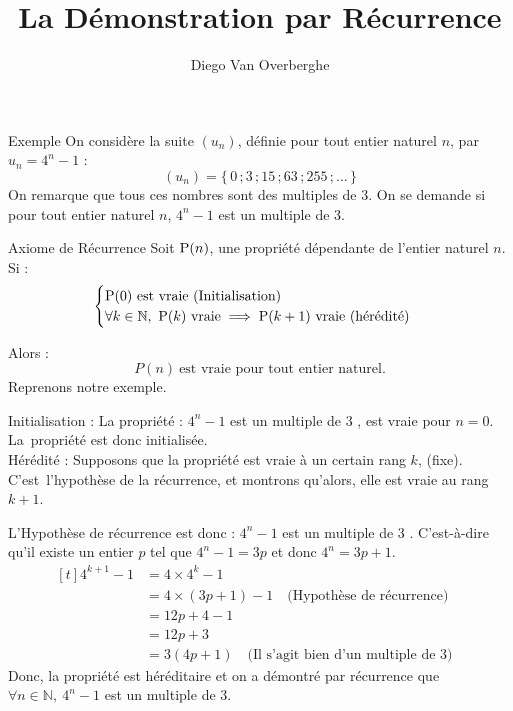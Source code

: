\documentclass{cours}
\title{La Démonstration par Récurrence}
\author{Diego Van Overberghe}
\begin{document}

    \begin{Gpartie}{Exemple}
        On considère la suite $\left(u_n\right)$, définie pour tout entier naturel $n$, par $u_n=4^n-1$ :
        \[\left(u_n\right)=\big\{\,0\,; 3\,; 15\,; 63\,; 255\,; \dotso\,\big\}\]
        On remarque que tous ces nombres sont des multiples de 3. On se demande si pour tout entier naturel $n$, $4^n-1$ est un multiple de 3.
    \end{Gpartie}
    \begin{Gpartie}{Axiome de Récurrence}
        Soit $\mathrm{P}(n)$, une propriété dépendante de l'entier naturel $n$.\\
        Si :
        \[\begin{cases}
            \mathrm{P}(0)\text{ est vraie (Initialisation)} \\ \forall k\in\mathbb{N},~\mathrm{P}(k)\text{ vraie}\implies\mathrm{P}(k+1)\text{ vraie (hérédité)}
        \end{cases}\]

        Alors : \[P(n)~\text{est vraie pour tout entier naturel.}\]
        Reprenons notre exemple. 
        
        Initialisation : La propriété : \og $4^n-1$ est un multiple de 3 \fg{}, est vraie pour $n=0$. La~propriété est donc initialisée. \\ 
        Hérédité : Supposons que la propriété est vraie à un certain rang $k$, (fixe). C'est~l'hypothèse de la récurrence, et montrons qu'alors, elle est vraie au rang $k+1$.
        
        L'Hypothèse de récurrence est donc : \og $4^n-1$ est un multiple de 3 \fg{}. C'est-à-dire qu'il existe un entier $p$ tel que $4^n-1=3p$ et donc $4^n=3p+1$.
        \vspace*{-1ex}\[\begin{aligned}[t]
            4^{k+1}-1&=4\times 4^k-1 &\\
            &= 4\times\left(3p+1\right)-1 \quad \text{(Hypothèse de récurrence)} &\\
            &=12p+4-1 &\\
            &=12p+3 &\\
            &=3\left(4p+1\right) \quad \text{(Il s'agit bien d'un multiple de 3)}
        \end{aligned}\]
        Donc, la propriété est héréditaire et on a démontré par récurrence que $\forall n\in\mathbb{N},~4^n-1$ est un multiple de 3.
    \end{Gpartie}
\end{document}
